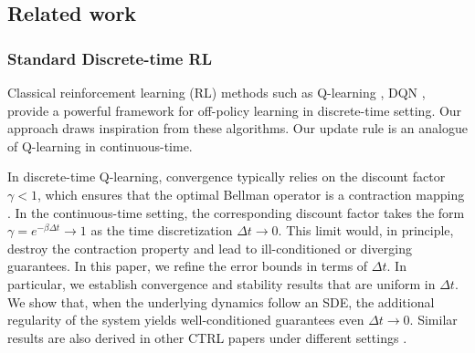 \documentclass[12pt]{article}
\def\dt{{\Delta t}}
\begin{document}
\subsection{Related work}
\subsubsection{Standard Discrete-time RL}

Classical reinforcement learning (RL) methods such as Q-learning \citep{watkins1992q}, DQN \citep{mnih2015human}, provide a powerful framework for off-policy learning in discrete-time setting. Our approach draws inspiration from these algorithms. Our update rule is an analogue of Q-learning \citep{watkins1992q} in continuous-time. %

In discrete-time Q-learning, convergence typically relies on the discount factor $\gamma<1$, which ensures that the optimal Bellman operator is a contraction mapping \citep{bertsekas2012dynamic}. In the continuous-time setting, the corresponding discount factor takes the form $\gamma = e^{-\beta \Delta t} \to 1$ as the time discretization $\Delta t \to 0$. This limit would, in principle, destroy the contraction property and lead to ill-conditioned or diverging guarantees. In this paper, we refine the error bounds in terms of $\Delta t$. In particular, we establish convergence and stability results that are uniform in $\Delta t$. We show that, when the underlying dynamics follow an SDE, the additional regularity of the system yields well-conditioned guarantees even $\dt\to0$. Similar results are also derived in other CTRL papers under different settings \citep{zhu2024phibe,zhu2025optimal,mou2024bellman}.
\end{document}
